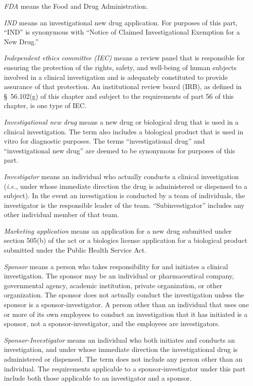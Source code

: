 \documentclass[11pt]{article}
\begin{document}
\textit{FDA} means the Food and Drug Administration.

\textit{IND} means an investigational new drug application. For purposes of this part, ``IND'' is synonymous with ``Notice of Claimed Investigational Exemption for a New Drug.''

\textit{Independent ethics committee (IEC)} means a review panel that is responsible for ensuring the protection of the rights, safety, and well-being of human subjects involved in a clinical investigation and is adequately constituted to provide assurance of that protection. An institutional review board (IRB), as defined in \S~56.102(g) of this chapter and subject to the requirements of part 56 of this chapter, is one type of IEC.

\textit{Investigational new drug} means a new drug or biological drug that is used in a clinical investigation. The term also includes a biological product that is used in vitro for diagnostic purposes. The terms ``investigational drug'' and ``investigational new drug'' are deemed to be synonymous for purposes of this part.

\textit{Investigator} means an individual who actually conducts a clinical investigation (\textit{i.e.}, under whose immediate direction the drug is administered or dispensed to a subject). In the event an investigation is conducted by a team of individuals, the investigator is the responsible leader of the team. ``Subinvestigator'' includes any other individual member of that team.

\textit{Marketing application} means an application for a new drug submitted under section 505(b) of the act or a biologics license application for a biological product submitted under the Public Health Service Act.

\textit{Sponsor} means a person who takes responsibility for and initiates a clinical investigation. The sponsor may be an individual or pharmaceutical company, governmental agency, academic institution, private organization, or other organization. The sponsor does not actually conduct the investigation unless the sponsor is a sponsor-investigator. A person other than an individual that uses one or more of its own employees to conduct an investigation that it has initiated is a sponsor, not a sponsor-investigator, and the employees are investigators.

\textit{Sponsor-Investigator} means an individual who both initiates and conducts an investigation, and under whose immediate direction the investigational drug is administered or dispensed. The term does not include any person other than an individual. The requirements applicable to a sponsor-investigator under this part include both those applicable to an investigator and a sponsor.
\end{document}
